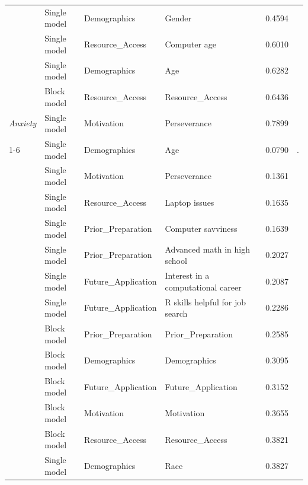 \begin{table}[!h]
\begin{threeparttable}
\begin{tabular}[t]{>{}llllrl}
 & Single model & Demographics & Gender & 0.4594 & \\

 & Single model & Resource_Access & Computer age & 0.6010 & \\

 & Single model & Demographics & Age & 0.6282 & \\

 & Block model & Resource_Access & Resource_Access & 0.6436 & \\

\multirow[t]{-19}{*}[\normalbaselineskip]{\raggedright\arraybackslash \em{Anxiety}} & Single model & Motivation & Perseverance & 0.7899 & \\
\cmidrule{1-6}
 & Single model & Demographics & Age & 0.0790 & .\\

 & Single model & Motivation & Perseverance & 0.1361 & \\

 & Single model & Resource_Access & Laptop issues & 0.1635 & \\

 & Single model & Prior_Preparation & Computer savviness & 0.1639 & \\

 & Single model & Prior_Preparation & Advanced math in high school & 0.2027 & \\

 & Single model & Future_Application & Interest in a computational career & 0.2087 & \\

 & Single model & Future_Application & R skills helpful for job search & 0.2286 & \\

 & Block model & Prior_Preparation & Prior_Preparation & 0.2585 & \\

 & Block model & Demographics & Demographics & 0.3095 & \\

 & Block model & Future_Application & Future_Application & 0.3152 & \\

 & Block model & Motivation & Motivation & 0.3655 & \\

 & Block model & Resource_Access & Resource_Access & 0.3821 & \\

 & Single model & Demographics & Race & 0.3827 & \\


\end{tabular}
\end{threeparttable}
\end{table}
